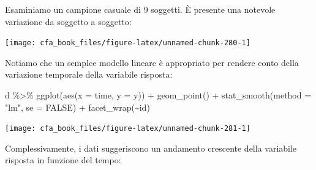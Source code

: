 \documentclass[
  11pt,
]{krantz}
\makeatletter
\newenvironment{Shaded}{\begin{snugshade}}{\end{snugshade}}
\newcommand{\AttributeTok}[1]{\textcolor[rgb]{0.61,0.61,0.61}{#1}}
\newcommand{\ConstantTok}[1]{\textcolor[rgb]{0,0,0}{#1}}
\newcommand{\DecValTok}[1]{\textcolor[rgb]{0.06,0.06,0.06}{#1}}
\newcommand{\FunctionTok}[1]{\textcolor[rgb]{0,0,0}{#1}}
\newcommand{\NormalTok}[1]{#1}
\newcommand{\OtherTok}[1]{\textcolor[rgb]{0.37,0.37,0.37}{#1}}
\newcommand{\SpecialCharTok}[1]{\textcolor[rgb]{0,0,0}{#1}}
\newcommand{\StringTok}[1]{\textcolor[rgb]{0.5,0.5,0.5}{#1}}
\newenvironment{kframe}{%
\medskip{}
\setlength{\fboxsep}{.8em}
 \def\at@end@of@kframe{}%
 \ifinner\ifhmode%
  \def\at@end@of@kframe{\end{minipage}}%
  \begin{minipage}{\columnwidth}%
 \fi\fi%
 \def\FrameCommand##1{\hskip\@totalleftmargin \hskip-\fboxsep
 \colorbox{shadecolor}{##1}\hskip-\fboxsep
     \hskip-\linewidth \hskip-\@totalleftmargin \hskip\columnwidth}%
 \MakeFramed {\advance\hsize-\width
   \@totalleftmargin\z@ \linewidth\hsize
   \@setminipage}}%
 {\par\unskip\endMakeFramed%
 \at@end@of@kframe}
\renewenvironment{Shaded}{\begin{kframe}}{\end{kframe}}
\theoremstyle{definition}
\theoremstyle{definition}
\theoremstyle{definition}
\theoremstyle{definition}
\theoremstyle{remark}
\makeatother
\begin{document}
Esaminiamo un campione casuale di 9 soggetti. È presente una notevole variazione da soggetto a soggetto:

\begin{Shaded}
\end{Shaded}

\begin{center}\texttt{[image: cfa\_book\_files/figure-latex/unnamed-chunk-280-1]} \end{center}

Notiamo che un semplce modello lineare è appropriato per rendere conto della variazione temporale della variabile risposta:

\begin{Shaded}
\begin{Highlighting}[]
\NormalTok{d }\SpecialCharTok{\%\textgreater{}\%}
  \FunctionTok{ggplot}\NormalTok{(}\FunctionTok{aes}\NormalTok{(}\AttributeTok{x =}\NormalTok{ time, }\AttributeTok{y =}\NormalTok{ y)) }\SpecialCharTok{+}
  \FunctionTok{geom\_point}\NormalTok{() }\SpecialCharTok{+}
  \FunctionTok{stat\_smooth}\NormalTok{(}\AttributeTok{method =} \StringTok{"lm"}\NormalTok{, }\AttributeTok{se =} \ConstantTok{FALSE}\NormalTok{) }\SpecialCharTok{+}
  \FunctionTok{facet\_wrap}\NormalTok{(}\SpecialCharTok{\textasciitilde{}}\NormalTok{id)}
\end{Highlighting}
\end{Shaded}

\begin{center}\texttt{[image: cfa\_book\_files/figure-latex/unnamed-chunk-281-1]} \end{center}

Complessivamente, i dati suggeriscono un andamento crescente della variabile risposta in funzione del tempo:
\end{document}
